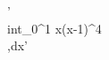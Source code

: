 \documentclass[preview]{standalone}
\begin{document}
\begin{center}
' \\int_{0}^{1} x(x-1)^4 \\,dx'
\end{center}
\end{document}
